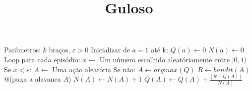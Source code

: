 \documentclass[brazilian,preview]{standalone}
\title{Guloso}
\begin{document}
\begin{algorithm}
Parâmetros: $k$ braços, $\varepsilon > 0$
Inicializar de $a=1$ até k:
    $Q(a) \leftarrow 0$ 
    $N(a) \leftarrow 0$ 
Loop para cada episódio:
    $x \leftarrow $ Um número escolhido aleatóriamente entre $[0, 1)$
    Se $x < \varepsilon$:
        $A \leftarrow$  Uma ação aleatória
    Se não: 
        $A \leftarrow argmax(Q)$ 
    $R \leftarrow bandit(A)$ @\hfill@ (puxa a alavanca $A$)
    $N(A) \leftarrow N(A) + 1$
    $Q(A) \leftarrow Q(A) + \frac{[R - Q(A)]}{N(A)}$
\end{algorithm}
\end{document}
